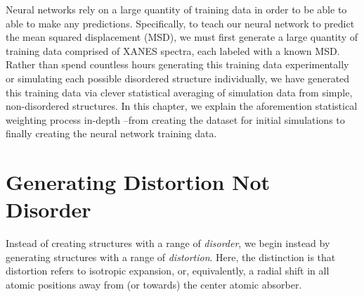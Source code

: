 
Neural networks rely on a large quantity of training data in order to be able to able to make any predictions. Specifically, to teach our neural network to predict the mean squared displacement (MSD), we must first generate a large quantity of training data comprised of XANES spectra, each labeled with a known MSD. Rather than spend countless hours generating this training data experimentally or simulating each possible disordered structure individually, we have generated this training data via clever statistical averaging of simulation data from simple, non-disordered structures. In this chapter, we explain the aforemention statistical weighting process in-depth --from creating the dataset for initial simulations to finally creating the neural network training data.

\section{Generating Distortion Not Disorder}
Instead of creating structures with a range of \textit{disorder}, we begin instead by generating structures with a range of \textit{distortion}. Here, the distinction is that distortion refers to isotropic expansion, or, equivalently, a radial shift in all atomic positions away from (or towards) the center atomic absorber.

